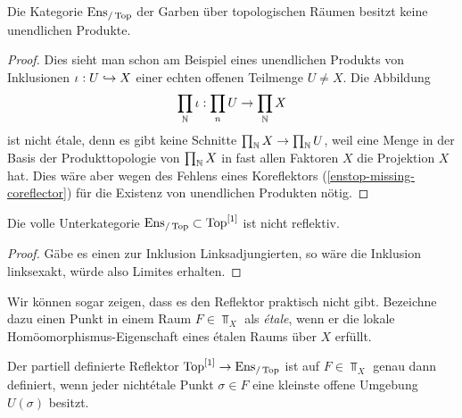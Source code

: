 \begin{prop} \label{enstop-not-complete}
  Die Kategorie $\operatorname{Ens}_{/\operatorname{Top}}$ der Garben über topologischen Räumen besitzt
  keine unendlichen Produkte.
\end{prop}
\begin{proof}
  Dies sieht man schon am Beispiel eines unendlichen Produkts von
  Inklusionen $\iota: U \hookrightarrow X$ einer echten offenen Teilmenge $U \neq
  X$. Die Abbildung
  \[ \prod_{\mathbb{N}} \iota: \prod_n U \to \prod_{\mathbb{N}} X \]
  ist nicht étale, denn es gibt keine Schnitte $\prod_{\mathbb{N}} X \to
  \prod_{\mathbb{N}} U$, weil eine Menge in der Basis der Produkttopologie von
  $\prod_{\mathbb{N}} X$ in fast allen Faktoren $X$ die Projektion $X$ hat. Dies
  wäre aber wegen des Fehlens eines Koreflektors
  (\ref{enstop-missing-coreflector}) für die Existenz von unendlichen
  Produkten nötig.
\end{proof}
\begin{kor} \label{enstop-not-reflective}
  Die volle Unterkategorie $\operatorname{Ens}_{/\operatorname{Top}} \subset \operatorname{Top}^{[1]}$ ist nicht
  reflektiv.
\end{kor}
\begin{proof}
  Gäbe es einen zur Inklusion Linksadjungierten, so wäre die Inklusion
  linksexakt, würde also Limites erhalten.
\end{proof}
Wir können sogar zeigen, dass es den Reflektor praktisch nicht
gibt. Bezeichne dazu einen Punkt in einem Raum $F \in \Top_X$ als
\emph{étale}, wenn er die lokale Homöomorphismus-Eigenschaft eines
étalen Raums über $X$ erfüllt.
\begin{prop}
  Der partiell definierte Reflektor $\operatorname{Top}^{[1]} \to \operatorname{Ens}_{/\operatorname{Top}}$ ist auf
  $F \in \Top_X$ genau dann definiert, wenn jeder nichtétale Punkt
  $\sigma \in F$ eine kleinste offene Umgebung $U(\sigma)$ besitzt.
\end{prop}
